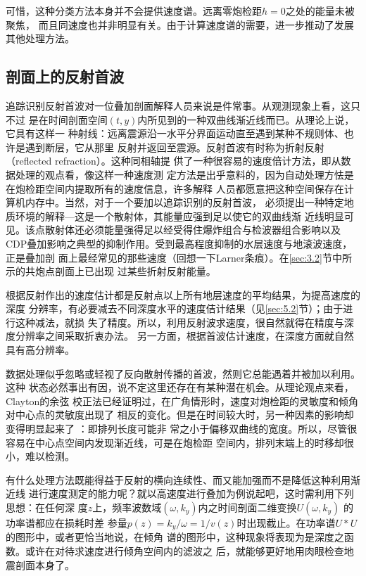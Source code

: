 可惜，这种分类方法本身并不会提供速度谱。远离零炮检距$h=0$之处的能量未被聚焦，
而且同速度也并非明显有关。由于计算速度谱的需要，进一步推动了发展其他处理方法。

\subsection{剖面上的反射首波}
\label{sec:3.5.10}

追踪识别反射首波对一位叠加剖面解释人员来说是件常事。从观测现象上看，这只不过
是在时间剖面空间$(t,y)$内所见到的一种双曲线渐近线而已。从理论上说，它具有这样一
种射线：远离震源沿一水平分界面运动直至遇到某种不规则体、也许是遇到断层，它从那里
反射并返回至震源。反射首波有时称为折射反射（reflected
refraction）。这种同相轴提
供了一种很容易的速度倍计方法，即从数据处理的观点看，像这样一种速度测
定方法是出乎意料的，因为自动处理方怯是在炮检距空间内提取所有的速度信息，许多解释
人员都愿意把这种空间保存在计算机内存中。当然，对于一个要加以追踪识别的反射首波，
必须提出一种特定地质环境的解释---这是一个散射体，其能量应强到足以使它的双曲线渐
近线明显可见。该点散射体还必须能量强得足以经受得住爆炸组合与检波器组合影响以及
CDP叠加影响之典型的抑制作用。受到最高程度抑制的水层速度与地滚波速度，正是叠加剖
面上最经常见的那些速度（回想一下Larner条痕）。在\ref{sec:3.2}节中所示的共炮点剖面上已出现
过某些折射反射能量。

根据反射作出的速度估计都是反射点以上所有地层速度的平均结果，为提高速度的深度
分辨率，有必要减去不同深度水平的速度佶计结果（见\ref{sec:5.2}节）；由于进行这种减法，就损
失了精度。所以，利用反射波求速度，很自然就得在精度与深度分辨率之间采取折衷办法。
另一方面，根据首波估计速度，在深度方面就自然具有高分辨率。

数据处理似乎忽略或轻视了反向散射传播的首波，然则它总能遇着并被加以利用。这种
状态必然事出有因，说不定这里还存在有某种潜在机会。从理论观点来看，Clayton的余弦
校正法已经证明过，在广角情形时，速度对炮检距的灵敏度和倾角对中心点的灵敏度出现了
相反的变化。但是在时间较大时，另一种因素的影响却变得明显起来了
：即排列长度可能非
常之小于偏移双曲线的宽度。所以，尽管很容易在中心点空间内发现渐近线，可是在炮检距
空间内，排列末端上的时移却很小，难以检测。

有什么处理方法既能得益于反射的横向连续性、而又能加强而不是降低这种利用渐近线
进行速度测定的能力呢？就以高速度进行叠加为例说起吧，这时需利用下列思想：在任何深
度$z$上，频率波数域$(\omega,k_y)$内之时间剖面二维变换$U(\omega,k_y)$
的功率谱都应在损耗时差
参量$p(z)=k_y/\omega=1/v(z)$时出现截止。在功率谱$U*U$的图形中，或者更恰当地说，在倾角
谱的图形中，这种现象将表现为是深度之函数。或许在对待求速度进行倾角空间内的滤波之
后，就能够更好地用肉眼检查地震剖面本身了。

